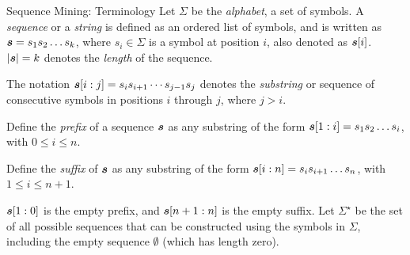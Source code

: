 
\date{Chapter 10: Sequence Mining}

\begin{frame}
\titlepage
\end{frame}

\newcommand{\alggsp}{\textsc{GSP}\xspace}
\newcommand{\algspade}{\textsc{Spade}\xspace}
\newcommand{\algSeqcomputesupport}{\textsc{ComputeSupport}\xspace}
\newcommand{\algSeqextprefix}{\textsc{ExtendPrefixTree}\xspace}
\newcommand{\algprefixspan}{\textsc{PrefixSpan}\xspace}
\newcommand{\algUkkonenSimple}{\textsc{NaiveUkkonen}\xspace}
\newcommand{\algUkkonen}{\textsc{Ukkonen}\xspace}


\begin{frame}{Sequence Mining: Terminology}
Let $\Sigma$ be the {\em alphabet}, a set of symbols.
A {\em sequence} or a {\em string} is def\/{i}ned
as an ordered list of symbols, and is written as ${\boldsymbol s} =  s_{1}s_{2}
\dots s_{k}$, where $s_i \in \Sigma$ is a symbol at position $i$, also
denoted as ${\boldsymbol s}[i]$. 
$|{\boldsymbol s}| = k$ denotes the {\em length} of the
sequence.  

\medskip
The notation ${\boldsymbol s}[i:j] = s_is_{i+1}\cdots
s_{j-1}s_{j}$ denotes the {\em substring} or sequence of consecutive
symbols in positions $i$ through $j$, where $j > i$.  

\medskip
Def\/{i}ne the {\em
pref\/{i}x} of a sequence ${\boldsymbol s}$ as any substring of the form
${\boldsymbol s}[1:i]=s_1s_2\ldots s_i$, with $0 \le i \le n$.


\medskip
Def\/{i}ne the {\em suff\/{i}x}
of ${\boldsymbol s}$ as any substring of the form ${\boldsymbol s}[i:n] = s_is_{i+1}\ldots
s_{n}$, with $1 \le i \le n+1$. 

\medskip
${\boldsymbol s}[1:0]$ is the empty
pref\/{i}x, and ${\boldsymbol s}[n+1:n]$ is the empty suff\/{i}x. Let $\Sigma^\star$ be the set of all possible sequences
that can be constructed using the symbols in $\Sigma$, including the
empty sequence $\emptyset$ (which has length zero).

\end{frame}




